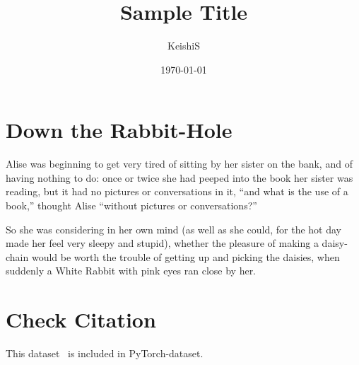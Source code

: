 \documentclass[10pt]{article}
\title{Sample Title}
\author{KeishiS}
\date{\today}
\begin{document}
\maketitle

\section{Down the Rabbit-Hole}

Alise was beginning to get very tired of sitting by her sister on the bank, and of having nothing to do: once or twice she had peeped into the book her sister was reading, but it had no pictures or conversations in it, “and what is the use of a book,” thought Alise “without pictures or conversations?”

So she was considering in her own mind (as well as she could, for the hot day made her feel very sleepy and stupid), whether the pleasure of making a daisy-chain would be worth the trouble of getting up and picking the daisies, when suddenly a White Rabbit with pink eyes ran close by her.

\section{Check Citation}

This dataset~\cite{Morris2020-cq} is included in PyTorch-dataset.



\end{document}
